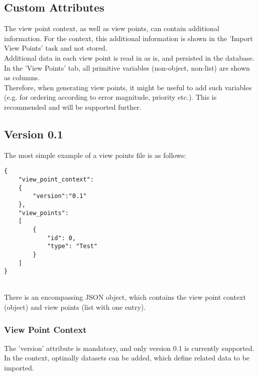 \subsection{Custom Attributes}
\label{sec:view_points_custom_attributes} 

The view point context, as well as view points, can contain additional information. For the context, this additional information is shown in the 'Import View Points' task and not stored. \\

Additional data in each view point is read in as is, and persisted in the database. In the 'View Points' tab, all primitive variables (non-object, non-list) are shown as columns. \\

Therefore, when generating view points, it might be useful to add such variables (e.g. for ordering according to error magnitude, priority etc.). This is recommended and will be supported further.
 
\subsection{Version 0.1}

The most simple example of a view points file is as follows:

\begin{lstlisting}[basicstyle=\small\ttfamily]
{
    "view_point_context": 
    {
        "version":"0.1"
    },
    "view_points": 
    [
        {
            "id": 0,
            "type": "Test"
        }    
    ]
}
\end{lstlisting}
\ \\

There is an encompassing JSON object, which contains the view point context (object) and view points (list with one entry). \\

\subsubsection{View Point Context}

The 'version' attribute is mandatory, and only version 0.1 is currently supported. \\

In the context, optinally datasets can be added, which define related data to be imported.

